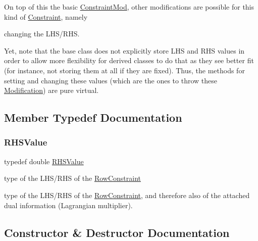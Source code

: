 On top of this the basic \mbox{\hyperlink{class_s_m_spp__di__unipi__it_1_1_constraint_mod}{Constraint\+Mod}}, other modifications are possible for this kind of \mbox{\hyperlink{class_s_m_spp__di__unipi__it_1_1_constraint}{Constraint}}, namely


\begin{DoxyItemize}
\item changing the L\+H\+S/\+R\+HS.
\end{DoxyItemize}

Yet, note that the base class does not explicitly store L\+HS and R\+HS values in order to allow more flexibility for derived classes to do that as they see better fit (for instance, not storing them at all if they are fixed). Thus, the methods for setting and changing these values (which are the ones to throw these \mbox{\hyperlink{class_s_m_spp__di__unipi__it_1_1_modification}{Modification}}) are pure virtual. 

\subsection{Member Typedef Documentation}
\mbox{\label{class_s_m_spp__di__unipi__it_1_1_row_constraint_a8813536ab3b13a81c8e83a999ade3bd8}} 
\subsubsection{\texorpdfstring{R\+H\+S\+Value}{RHSValue}}
{\footnotesize\ttfamily typedef double \mbox{\hyperlink{class_s_m_spp__di__unipi__it_1_1_row_constraint_a8813536ab3b13a81c8e83a999ade3bd8}{R\+H\+S\+Value}}}



type of the L\+H\+S/\+R\+HS of the \mbox{\hyperlink{class_s_m_spp__di__unipi__it_1_1_row_constraint}{Row\+Constraint}} 

type of the L\+H\+S/\+R\+HS of the \mbox{\hyperlink{class_s_m_spp__di__unipi__it_1_1_row_constraint}{Row\+Constraint}}, and therefore also of the attached dual information (Lagrangian multiplier). 

\subsection{Constructor \& Destructor Documentation}
\mbox{\label{class_s_m_spp__di__unipi__it_1_1_row_constraint_a99ba5ca06cbb289d6ca42276abab63ae}} 
